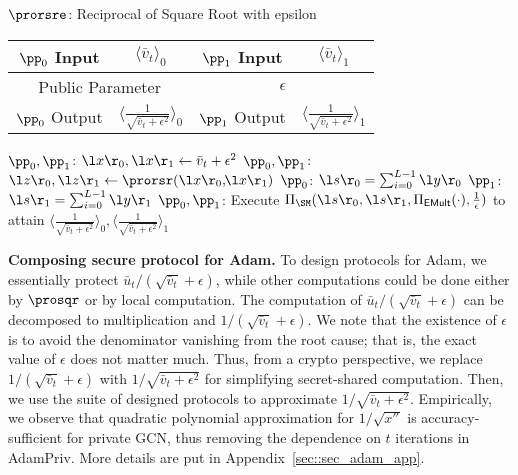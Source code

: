  \begin{protocol}[!t] 
	\caption{$\prorsre$: Reciprocal of Square Root with epsilon}
	\label{pro::reci_sqrt_eps}
	\begin{center}
		\setlength\tabcolsep{5pt}
		\begin{tabular}{c|c|c|c}
		{$\pp_{0}$ Input} & {$ \langle \bar{v}_t \rangle _0 $} 
          & {$\pp_{1}$ Input} & {$\langle \bar{v}_t \rangle _1 $} \\\hline
           \multicolumn{2}{c|}{Public Parameter} & \multicolumn{2}{c}{$\epsilon$} \\
           \hline
            $\pp_0$ Output & $\langle \frac{1}{\sqrt{\bar{v}_t+\epsilon ^2}} \rangle_0 $& $\pp_1$ Output & $\langle  \frac{1}{\sqrt{\bar{v}_t+\epsilon ^2}} \rangle_1 $  \\\hline
		\end{tabular}
	\end{center}
	\begin{algorithmic}[1]
 \STATE $\pp_0,\pp_1$: $\l x\r_0, \l x\r_1 \leftarrow \bar{v}_t+ \epsilon ^2$\label{rsr:l1}
 \STATE $\pp_0,\pp_1$:$\l z\r_0, \l z\r_1\leftarrow\prorsr(\l x\r_0,\hspace{-1mm}\l x\r_1)$\hfill{}
  \STATE $\pp_0$: $\l s\r_0= \sum _{i=0} ^{L-1} \l y\r_0$\label{rsr:l3} \hfill{}
  \STATE $\pp_1$: $\l s\r_1= \sum _{i=0} ^{L-1} \l y\r_1$\label{rsr:l4} \hfill{}
  \STATE $\pp_0,\pp_1$: Execute $\Pi_\SM(\l s\r_0, \l s\r_1, \Pi_{\mathsf{EMult}}(\cdot), \frac{1}{\epsilon})$ to attain 
 $\langle \frac{1}{\sqrt{\bar{v}_t+\epsilon ^2}} \rangle_0,\langle \frac{1}{\sqrt{\bar{v}_t+\epsilon ^2}} \rangle_1$\label{rsr:l11}
	\end{algorithmic}
\end{protocol}

\noindent\textbf{Composing secure protocol for Adam.}
To design protocols for Adam, we essentially  protect ${\bar{u}_t}/{(\sqrt{\bar{v}_t}+\epsilon)}$, while other computations could be done either by $\prosqr$ or by local computation.
The computation of ${\bar{u}_t}/{(\sqrt{\bar{v}_t}+\epsilon)}$ can be decomposed to multiplication and $1/{(\sqrt{\bar{v}_t}+\epsilon)}$.
We note that the existence of $\epsilon$ is to avoid the denominator vanishing from the root cause; that is, the exact value of $\epsilon$ does not matter much.
Thus, from a crypto perspective, we replace  $1/{(\sqrt{\bar{v}_t}+\epsilon)}$ with $ {1}/\sqrt{\bar{v}_t+\epsilon^2}$ for simplifying secret-shared computation. 
Then, we use the suite of designed protocols to approximate ${1}/\sqrt{\bar{v}_t+\epsilon^2}$.
Empirically, we observe that quadratic polynomial approximation for ${1}/{\sqrt{x''}}$ is accuracy-sufficient for private GCN, thus removing the dependence on $t$ iterations in AdamPriv.
More details are put in Appendix~\ref{sec::sec_adam_app}.

